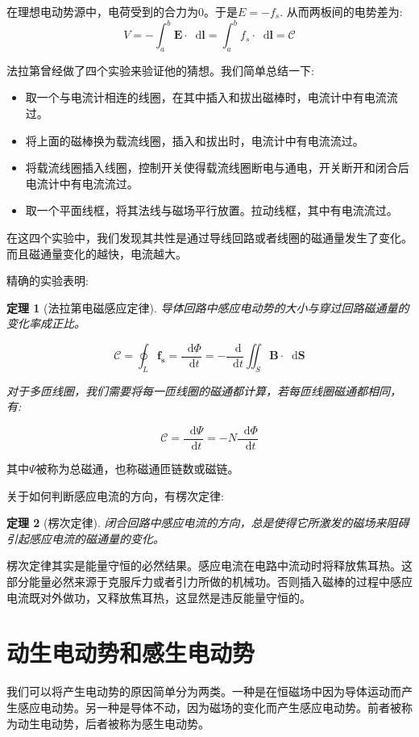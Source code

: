 \documentclass[12pt,a4paper,oneside]{report}
\newtheorem{theorem}{定理}[chapter]
\theoremstyle{definition}
\theoremstyle{remark}
\renewcommand{\d}{\mathop{}\!\mathrm{d}}
\begin{document}
在理想电动势源中，电荷受到的合力为$0$。于是$E=-f_s$. 从而两板间的电势差为:
\[
V=-\int_a^b \mathbf{E} \cdot \d \mathbf{l} = \int_a^b f_s \cdot \d \mathbf{l} = \mathscr C
\]

法拉第曾经做了四个实验来验证他的猜想。我们简单总结一下:
\begin{itemize}
  \item 取一个与电流计相连的线圈，在其中插入和拔出磁棒时，电流计中有电流流过。
  \item 将上面的磁棒换为载流线圈，插入和拔出时，电流计中有电流流过。
  \item 将载流线圈插入线圈，控制开关使得载流线圈断电与通电，开关断开和闭合后电流计中有电流流过。
  \item 取一个平面线框，将其法线与磁场平行放置。拉动线框，其中有电流流过。
\end{itemize}

在这四个实验中，我们发现其共性是通过导线回路或者线圈的磁通量发生了变化。而且磁通量变化的越快，电流越大。

精确的实验表明:

\begin{theorem}[法拉第电磁感应定律]
导体回路中感应电动势的大小与穿过回路磁通量的变化率成正比。

\[
\mathscr C =\oint_L  \mathbf{f_s} =  \frac{\d \Phi}{\d t} =-\frac{\d}{\d t}\iint_S \mathbf{B} \cdot \d \mathbf{S}
\]

对于多匝线圈，我们需要将每一匝线圈的磁通都计算，若每匝线圈磁通都相同，有:

\[
\mathscr C = \frac{\d \Psi}{\d t} =-N\frac{\d \Phi}{\d t}
\]
\end{theorem}
其中$\Psi$被称为总磁通，也称磁通匝链数或磁链。


关于如何判断感应电流的方向，有楞次定律:
\begin{theorem}[楞次定律]
  闭合回路中感应电流的方向，总是使得它所激发的磁场来阻碍引起感应电流的磁通量的变化。
\end{theorem}
楞次定律其实是能量守恒的必然结果。感应电流在电路中流动时将释放焦耳热。这部分能量必然来源于克服斥力或者引力所做的机械功。否则插入磁棒的过程中感应电流既对外做功，又释放焦耳热，这显然是违反能量守恒的。

\section{动生电动势和感生电动势}
我们可以将产生电动势的原因简单分为两类。一种是在恒磁场中因为导体运动而产生感应电动势。另一种是导体不动，因为磁场的变化而产生感应电动势。前者被称为动生电动势，后者被称为感生电动势。
\end{document}
